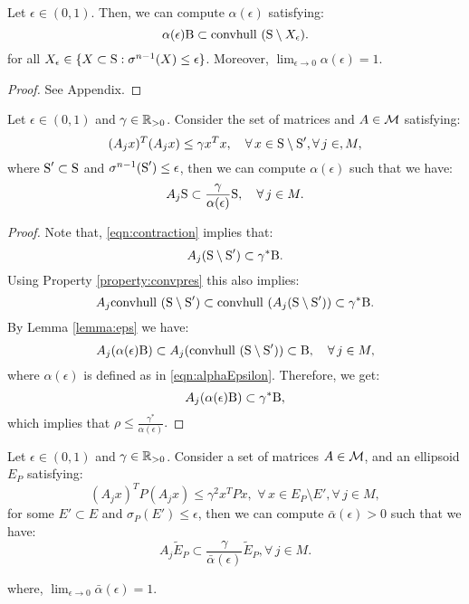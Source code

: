 \begin{lemma}\label{lemma:eps}Let $\epsilon \in (0, 1)$. Then, we can compute $\alpha(\epsilon)$ satisfying:
\begin{equation}\label{eqn:ballinc}\alpha(\epsilon) \text{B} \subset \mbox{convhull }(\text{S} \setminus X_\epsilon).
\end{equation}
for all $X_\epsilon \in \{X \subset \text{S}: \sigma^{n-1}(X) \leq \epsilon\}$. 
Moreover, $\lim_{\epsilon \to 0} \alpha(\epsilon) = 1$.
\end{lemma}

\begin{proof}See Appendix.
\end{proof}

\begin{lemma}\label{lemma:epsilon1}Let $\epsilon \in (0, 1)$ and $\gamma \in \mathbb{R}_{> 0}$. Consider the set of matrices and $A \in \mathcal{M}$ satisfying:
\begin{equation}\label{eqn:contraction}(A_jx)^T(A_jx) \leq \gamma x^Tx, \quad \forall\, x \in \text{S} \setminus \text{S}', \forall\,j \in, M,\end{equation}
where $\text{S}' \subset \text{S}$ and $\sigma^{n-1}(\text{S}') \leq \epsilon$, then we can compute
$\alpha(\epsilon)$ such that we have:
\begin{equation*}
A_j \text{S} \subset \frac{\gamma}{\alpha(\epsilon)} \text{S},\quad \forall\, j \in M.
\end{equation*}
\end{lemma}

\begin{proof}Note that, \eqref{eqn:contraction} implies that:
$$A_j (\text{S} \setminus \text{S}') \subset \gamma^* \text{B}.$$
Using Property \ref{property:convpres} this also implies:
$$A_j \mbox{convhull }(\text{S} \setminus \text{S}') \subset \mbox{convhull }(A_j(\text{S} \setminus \text{S}')) \subset \gamma^* \text{B} .$$
By Lemma \ref{lemma:eps} we have:
$$A_j (\alpha(\epsilon) \text{B}) \subset A_j (\mbox{convhull } (\text{S} \setminus \text{S}')) \subset \text{B}, \quad  \forall\, j \in M,$$
where $\alpha(\epsilon)$ is defined as in \eqref{eqn:alphaEpsilon}. Therefore, we get:
$$A_j (\alpha(\epsilon) \text{B}) \subset \gamma^*\text{B},$$
which implies that $\rho \leq \frac{\gamma^*}{\alpha(\epsilon)}.$
\end{proof}


\begin{theorem}\label{thm:mainTheorem1}Let $\epsilon \in (0,1)$ and $\gamma \in \mathbb{R}_{> 0}$. Consider a set of matrices $A \in \mathcal{M}$, and an ellipsoid $E_P$ satisfying:
\begin{equation}\label{eqn:ellipsoid}(A_j x)^TP(A_j x) \leq \gamma^2x^TPx,\,\, \forall\, x \in E_P \setminus E', \forall\, j \in M, \end{equation}
for some $E' \subset E$ and $\sigma_P(E') \leq \epsilon$, then we can compute $\bar{\alpha}(\epsilon) > 0$ such that we have:
\begin{equation}\label{eqn:contractionEllipsoid}A_j \tilde{E}_P \subset \frac{\gamma}{\bar{\alpha}(\epsilon)}\tilde{E}_P, \forall\, j \in M.
\end{equation}
\end{theorem}
where, $\lim_{\epsilon \to 0} \bar{\alpha}(\epsilon) = 1$.


